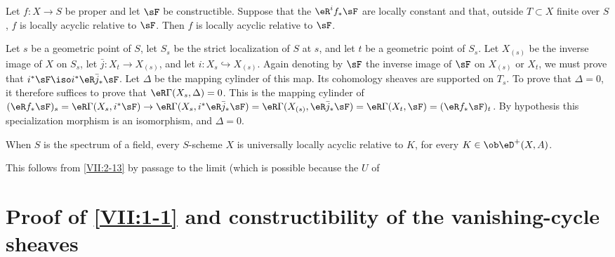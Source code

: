 \begin{lemma_}\label{VII:2-15}
Let $f:X\to S$ be proper and let $\sF$ be constructible. Suppose that the
$\eR^i f_\ast \sF$ are locally constant and that, outside $T\subset X$ finite
over $S$, $f$ is locally acyclic relative to $\sF$. Then $f$ is locally
acyclic relative to $\sF$.
\end{lemma_}

Let $s$ be a geometric point of $S$, let $S_s$ be the strict localization of
$S$ at $s$, and let $t$ be a geometric point of $S_s$. Let $X_{(s)}$ be the
inverse image of $X$ on $S_s$, let $\bar j:X_t \to X_{(s)}$, and let
$i:X_s \hookrightarrow X_{(s)}$. Again denoting by $\sF$ the inverse image of
$\sF$ on $X_{(s)}$ or $X_t$, we must prove that
$i^\ast \sF \iso i^\ast \eR \bar j_\ast \sF$. Let $\Delta$ be the mapping
cylinder of this map. Its cohomology sheaves are supported on $T_s$. To prove
that $\Delta=0$, it therefore suffices to prove that
$\eR\Gamma(X_s,\Delta)=0$. This is the mapping cylinder of
$(\eR f_\ast \sF)_s = \eR\Gamma(X_s,i^\ast \sF) \to \eR\Gamma(X_s,i^\ast \eR\bar j_\ast \sF) = \eR\Gamma(X_{(s)},\eR\bar j_\ast \sF) = \eR\Gamma(X_t,\sF) = (\eR f_\ast \sF)_t$.
By hypothesis this specialization morphism is an isomorphism, and
$\Delta=0$.





\begin{corollary_}\label{VII:2-16}
When $S$ is the spectrum of a field, every $S$-scheme $X$ is universally
locally acyclic relative to $K$, for every $K\in\ob\eD^+(X,A)$.
\end{corollary_}

This follows from \ref{VII:2-13} by passage to the limit (which is possible
because the $U$ of 








\section{Proof of \texorpdfstring{\ref{VII:1-1}}{1.1} and constructibility of the vanishing-cycle sheaves}\label{VII:3}






\subsection{}\label{VII:3-1}

